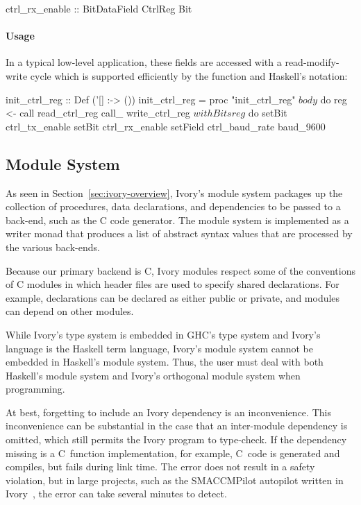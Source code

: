 \begin{code}
ctrl_rx_enable :: BitDataField CtrlReg Bit
\end{code}

\paragraph{Usage}
In a typical low-level application, these fields
are accessed with a read-modify-write cycle which is supported
efficiently by the  function and Haskell's
 notation:

\begin{code}
init_ctrl_reg :: Def ('[] :-> ())
init_ctrl_reg = proc "init_ctrl_reg" $ body $ do
  reg <- call read_ctrl_reg
  call_ write_ctrl_reg $ withBits reg $ do
    setBit   ctrl_tx_enable
    setBit   ctrl_rx_enable
    setField ctrl_baud_rate baud_9600
\end{code}

\subsection{Module System}
\label{sec:modules}

As seen in Section~\ref{sec:ivory-overview}, Ivory's module system packages up
the collection of procedures, data declarations, and dependencies to be passed
to a back-end, such as the C code generator. The module system is implemented as
a writer monad that produces a list of abstract syntax values that are processed
by the various back-ends.

Because our primary backend is C, Ivory modules respect some of the conventions
of C modules in which header files are used to specify shared declarations. For
example, declarations can be declared as either public or private, and modules
can depend on other modules.

While Ivory's type system is embedded in GHC's type system and Ivory's language
is the Haskell term language, Ivory's module system cannot be embedded in
Haskell's module system. Thus, the user must deal with both Haskell's module
system and Ivory's orthogonal module system when programming.

At best, forgetting to include an Ivory dependency is an inconvenience. This
inconvenience can be substantial in the case that an inter-module dependency is
omitted, which still permits the Ivory program to type-check. If the dependency
missing is a C~function implementation, for example, C~code is generated and
compiles, but fails during link time. The error does not result in a safety
violation, but in large projects, such as the SMACCMPilot autopilot written in
Ivory~\cite{}, the error can take several minutes to detect.

